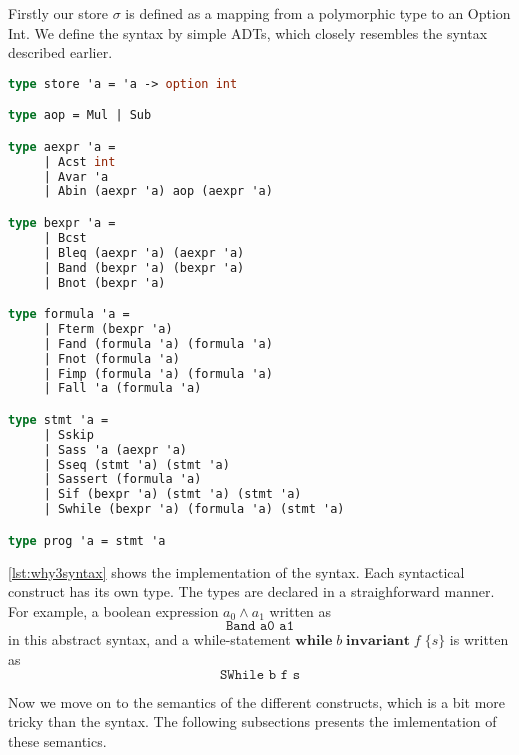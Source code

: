 Firstly our store $\sigma$ is defined as a mapping from a polymorphic type to an Option Int.
We define the syntax by simple ADTs, which closely resembles the syntax described earlier.

\begin{lstlisting}[caption={Syntax if the WHILE language, implemented in Why3},label={lst:why3syntax},language=sml]
type store 'a = 'a -> option int

type aop = Mul | Sub

type aexpr 'a =
     | Acst int
     | Avar 'a
     | Abin (aexpr 'a) aop (aexpr 'a)

type bexpr 'a =
     | Bcst
     | Bleq (aexpr 'a) (aexpr 'a)
     | Band (bexpr 'a) (bexpr 'a)
     | Bnot (bexpr 'a)

type formula 'a =
     | Fterm (bexpr 'a)
     | Fand (formula 'a) (formula 'a)
     | Fnot (formula 'a)
     | Fimp (formula 'a) (formula 'a)
     | Fall 'a (formula 'a)

type stmt 'a =
     | Sskip
     | Sass 'a (aexpr 'a)
     | Sseq (stmt 'a) (stmt 'a)
     | Sassert (formula 'a)
     | Sif (bexpr 'a) (stmt 'a) (stmt 'a)
     | Swhile (bexpr 'a) (formula 'a) (stmt 'a)

type prog 'a = stmt 'a
\end{lstlisting}

\autoref{lst:why3syntax} shows the implementation of the syntax.
Each syntactical construct has its own type. The types are declared in a straighforward manner.
For example, a boolean expression $a_{0} \land a_{1}$ written as
\[ \texttt{Band a0 a1} \]
in this abstract syntax, and a while-statement $\mathbf{while} \; b \; \mathbf{invariant} \; f \; \{s\}$ is written as
\[ \texttt{SWhile b f s} \]

Now we move on to the semantics of the different constructs, which is a bit more tricky than
the syntax. The following subsections presents the imlementation of these semantics.
